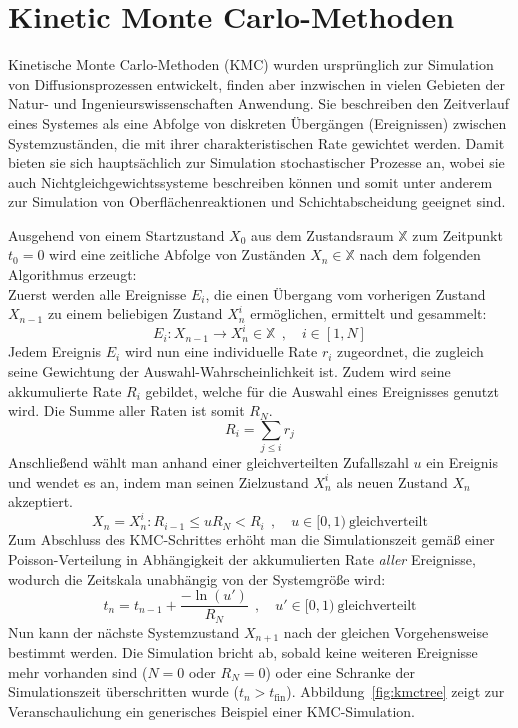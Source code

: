 \section{Kinetic Monte Carlo-Methoden}
\label{kmc}

Kinetische Monte Carlo-Methoden (KMC) wurden ursprünglich zur Simulation von Diffusionsprozessen entwickelt, finden aber inzwischen in vielen Gebieten der Natur- und Ingenieurswissenschaften Anwendung.
Sie beschreiben den Zeitverlauf eines Systemes als eine Abfolge von diskreten Übergängen (Ereignissen) zwischen Systemzuständen, die mit ihrer charakteristischen Rate gewichtet werden.
Damit bieten sie sich hauptsächlich zur Simulation stochastischer Prozesse an, wobei sie auch Nichtgleichgewichtssysteme beschreiben können und somit unter anderem zur Simulation von Oberflächenreaktionen und Schichtabscheidung geeignet sind.

Ausgehend von einem Startzustand $X_0$ aus dem Zustandsraum $\mathbb{X}$ zum Zeitpunkt $t_0 = 0$ wird eine zeitliche Abfolge von Zuständen $X_n \in \mathbb{X}$ nach dem folgenden Algorithmus erzeugt:\\
Zuerst werden alle Ereignisse $E_i$, die einen Übergang vom vorherigen Zustand $X_{n-1}$ zu einem beliebigen Zustand $X_n^i$ ermöglichen, ermittelt und gesammelt:
\begin{equation}
  E_i : X_{n-1} \rightarrow X_n^i \in \mathbb{X} ~~,\quad i \in [1, N]
\end{equation}
Jedem Ereignis $E_i$ wird nun eine individuelle Rate $r_i$ zugeordnet, die zugleich seine Gewichtung der Auswahl-Wahrscheinlichkeit ist.
Zudem wird seine akkumulierte Rate $R_i$ gebildet, welche für die Auswahl eines Ereignisses genutzt wird.
Die Summe aller Raten ist somit $R_N$.
\begin{equation}
  R_i = \sum_{j \le i}{r_j}
\end{equation}
Anschließend wählt man anhand einer gleichverteilten Zufallszahl $u$ ein Ereignis und wendet es an, indem man seinen Zielzustand $X_n^i$ als neuen Zustand $X_n$ akzeptiert.
\begin{equation}
  X_n = X_n^i : R_{i-1} \le u R_N < R_i ~~,\quad u \in [0,1)~\text{gleichverteilt}
\end{equation}
Zum Abschluss des KMC-Schrittes erhöht man die Simulationszeit gemäß einer Poisson-Verteilung in Abhängigkeit der akkumulierten Rate \textit{aller} Ereignisse, wodurch die Zeitskala unabhängig von der Systemgröße wird:
\begin{equation}
  t_n = t_{n-1} + \frac{-\ln(u')}{R_N} ~~,\quad u' \in [0,1)~\text{gleichverteilt}
\end{equation}
Nun kann der nächste Systemzustand $X_{n+1}$ nach der gleichen Vorgehensweise bestimmt werden.
Die Simulation bricht ab, sobald keine weiteren Ereignisse mehr vorhanden sind ($N=0$ oder $R_N=0$) oder eine Schranke der Simulationszeit überschritten wurde ($t_n > t_\text{fin}$).
Abbildung~\ref{fig:kmctree} zeigt zur Veranschaulichung ein generisches Beispiel einer KMC-Simulation.

